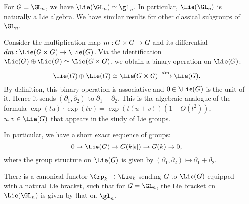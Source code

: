 \begin{exam}
	For $G=\GL_n$, we have $\Lie(\GL_n) \simeq \gl_n$. In particular, $\Lie(\GL_n)$ is naturally a Lie algebra. We have similar results for other classical subgroups of $\GL_n$.
\end{exam}

\begin{rem}
	Consider the multiplication map $m: G\mt G\to G$ and its differential $dm: \Lie(G\mt G)\to \Lie (G)$. Via the identification $\Lie(G)\oplus \Lie(G)\simeq \Lie(G\mt G)$, we obtain a binary operation on $\Lie(G)$:
	\[
		\Lie(G)\oplus \Lie(G) \simeq \Lie(G\mt G) \xrightarrow{dm} \Lie(G).
	\]
	By definition, this binary operation is associative and $0\in \Lie(G)$ is the unit of it. Hence it sends $(\partial_1,\partial_2)$ to $\partial_1+\partial_2$. This is the algebraic analogue of the formula $\exp(t u)\cdot \exp(t v) = \exp(t (u+v))(1 + O(t^2))$, $u,v\in \Lie(G)$ that appears in the study of Lie groups.

	In particular, we have a short exact sequence of groups:
	\begin{equation}
		\label{eqn-SES-Lie}
		0 \to \Lie(G) \to G(k[\epsilon]) \to G(k) \to 0,
	\end{equation}
	where the group structure on $\Lie(G)$ is given by $(\partial_1,\partial_2)\mapsto \partial_1+\partial_2$.
\end{rem}

\begin{thm}	
	There is a canonical functor $\Grp_k \to \Lie_k$ sending $G$ to $\Lie(G)$ equipped with a natural Lie bracket, such that for $G=\GL_n$, the Lie bracket on $\Lie(\GL_n)$ is given by that on $\gl_n$.
\end{thm}

